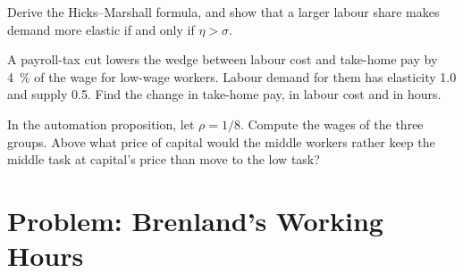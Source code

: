 \begin{exercise}[$\star\star\star$]\label{exo:b3:labour-supply-and-demand:10}
Derive the Hicks--Marshall formula, and show that a larger labour share makes demand
more elastic if and only if $\eta > \sigma$.
\end{exercise}

\begin{exercise}[$\star\star\star$]\label{exo:b3:labour-supply-and-demand:11}
A payroll-tax cut lowers the wedge between labour cost and take-home pay by 4~\% of
the wage for low-wage workers. Labour demand for them has elasticity 1.0 and supply
0.5. Find the change in take-home pay, in labour cost and in hours.
\end{exercise}

\begin{exercise}[$\star\star\star$]\label{exo:b3:labour-supply-and-demand:12}
In the automation proposition, let $\rho = 1/8$. Compute the wages of the three groups.
Above what price of capital would the middle workers rather keep the middle task at
capital's price than move to the low task?
\end{exercise}

\section{Problem: Brenland's Working Hours}\label{sec:b3:labour-supply-and-demand:problem}

